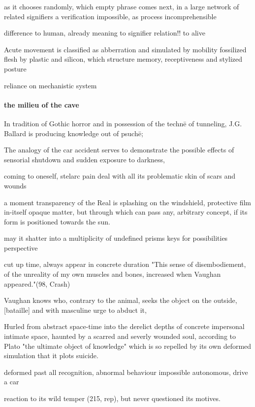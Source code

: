 \documentclass{article}
\begin{document}
as it chooses randomly, which empty phrase comes next,
in a large network of related signifiers
a verification impossible, as process incomprehensible

difference to human, already meaning to signifier
relation!! to alive






Acute movement is classified as abberration 
and simulated by mobility 
fossilized flesh by plastic and silicon, 
which structure memory, receptiveness and stylized posture

reliance on mechanistic system



\paragraph{the milieu of the cave} 
In tradition of Gothic horror and 
in possession of the techn\={e} of tunneling,
J.G. Ballard is producing knowledge out of psuch\={e}; 

The analogy of the car accident serves to demonstrate 
the possible effects 
of sensorial shutdown and sudden exposure to darkness, 

coming to oneself, stelarc pain
deal with all its problematic skin of scars and wounds

a moment transparency of the Real is splashing  
on the windshield, 
protective film
in-itself opaque matter, 
but through which can pass any, arbitrary concept, if its 
form is positioned towards the sun.

may it shatter into a multiplicity of undefined prisms 
keys for possibilities
perspective


cut up time, always appear in concrete duration
"This sense of disembodiement, of the unreality of my own muscles and bones, increased when Vaughan appeared."(98, Crash)

Vaughan knows
who, contrary to the animal, seeks the object on the outside,[bataille] 
and with masculine urge to abduct it, 

Hurled from abstract space-time into
the derelict depths of concrete impersonal intimate space, 
haunted by a scarred and severly wounded soul, 
according to Plato "the ultimate object of knowledge"
which is so repelled by its own deformed simulation that it plots suicide.

deformed past all recognition, 
abnormal behaviour
impossible autonomous, drive a car 


reaction to its wild temper (215, rep),
but never questioned its motives.
\end{document}
